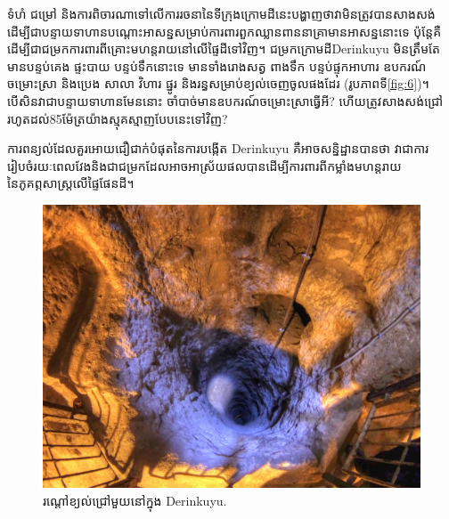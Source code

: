 \documentclass[10pt,twocolumn,letterpaper]{article}
\begin{document}
ទំហំ ជម្រៅ និងការពិចារណាទៅលើការរចនានៃទីក្រុងក្រោមដីនេះបង្ហាញថាវាមិនត្រូវបានសាងសង់ដើម្បីជាបន្ទាយទាហានបណ្តោះអាសន្នសម្រាប់ការពារពួកឈ្លានពាននាគ្រាមានអាសន្ននោះទេ ប៉ុន្តែគឺដើម្បីជាជម្រកការពារពីគ្រោះមហន្តរាយនៅលើផ្ទៃដីទៅវិញ។ ជម្រកក្រោមដីDerinkuyu មិនត្រឹមតែមានបន្ទប់គេង ផ្ទះបាយ បន្ទប់ទឹកនោះទេ មានទាំងរោងសត្វ ពាងទឹក បន្ទប់ផ្ទុកអាហារ ឧបករណ៍ចម្រោះស្រា និងប្រេង សាលា វិហារ ផ្នូរ និងរន្ធសម្រាប់ខ្យល់ចេញចូលផងដែរ (រូបភាពទី\ref{fig:6})។ បើសិនវាជាបន្ទាយទាហានមែននោះ ចាំបាច់មានឧបករណ៍ចម្រោះស្រាធ្វើអី? ហើយត្រូវសាងសង់ជ្រៅរហូតដល់85ម៉ែត្រយ៉ាងស្មុគស្មាញបែបនេះទៅវិញ?

ការពន្យល់ដែលគួរអោយជឿជាក់បំផុតនៃការបង្កើត Derinkuyu គឺអាចសន្និដ្ឋានបានថា វាជាការរៀបចំរយៈពេលវែងនិងជាជម្រកដែលអាចអាស្រ័យផលបានដើម្បីការពារពីកម្លាំងមហន្តរាយនៃភូគព្ភសាស្ត្រលើផ្ទៃផែនដី។

\begin{figure}[t]
\begin{center}
   \includegraphics[width=1\linewidth]{derinkuyu-air.jpg}
\end{center}
   \caption{រណ្តៅខ្យល់ជ្រៅមួយនៅក្នុង Derinkuyu\cite{53}.}
\label{fig:6}
\label{fig:onecol}
\end{figure}


\end{document}

